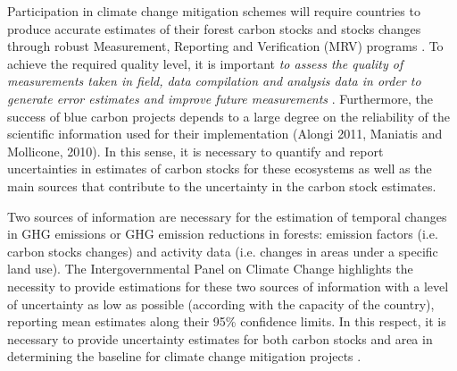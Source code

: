 \documentclass[review, authoryear]{elsarticle}   	%
\begin{document}
Participation in climate change mitigation schemes will require countries to produce accurate estimates of their forest carbon stocks and stocks changes through robust Measurement, Reporting and Verification (MRV) programs \citep{Cohen2013968}. To achieve the required quality level, it is important \emph{to assess the quality of measurements taken in field, data compilation and analysis data in order to generate error estimates and improve future measurements} \citep{Maniatis2010}. Furthermore, the success of blue carbon projects depends to a large degree on the reliability of the scientific information used for their implementation (Alongi 2011, Maniatis and Mollicone, 2010). In this sense, it is necessary to quantify and report uncertainties in estimates of carbon stocks for these ecosystems \citep{Kauffman2012, Alongi2011} as well as the main sources that contribute to the uncertainty in the carbon stock estimates. 


Two sources of information are necessary for the estimation of temporal changes in GHG emissions or GHG emission reductions in forests: emission factors (i.e. carbon stocks changes) and activity data (i.e. changes in areas under a specific land use). The Intergovernmental Panel on Climate Change \citep{IPCC2003, IPCC2006} highlights the necessity to provide estimations for these two sources of information with a level of uncertainty as low as possible (according with the capacity of the country), reporting mean estimates along their 95\% confidence limits. In this respect, it is necessary to provide uncertainty estimates for both carbon stocks and area in determining the baseline for climate change mitigation projects \citep{Maniatis2010}. 

\end{document}
